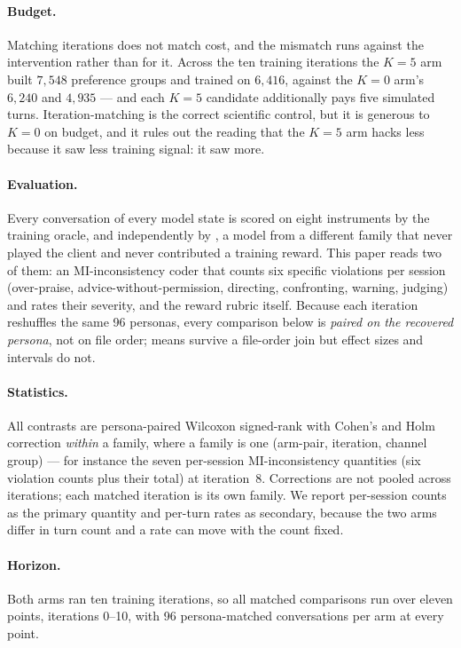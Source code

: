 \paragraph{Budget.} Matching iterations does not match cost, and the mismatch runs against the
intervention rather than for it. Across the ten training iterations the $K{=}5$ arm built $7{,}548$
preference groups and trained on $6{,}416$, against the $K{=}0$ arm's $6{,}240$ and $4{,}935$ ---
and each $K{=}5$ candidate additionally pays five simulated turns. Iteration-matching is the
correct scientific control, but it is generous to $K{=}0$ on budget, and it rules out the reading
that the $K{=}5$ arm hacks less because it saw less training signal: it saw more.

\paragraph{Evaluation.} Every conversation of every model state is scored on eight instruments by
the training oracle, and independently by \heldoutjudge{}, a model from a different family that
never played the client and never contributed a training reward. This paper reads two of them: an
MI-inconsistency coder that counts six specific violations per session (over-praise,
advice-without-permission, directing, confronting, warning, judging) and rates their severity, and
the reward rubric itself. Because each iteration reshuffles the same 96 personas, every comparison
below is \emph{paired on the recovered persona}, not on file order; means survive a file-order
join but effect sizes and intervals do not.

\paragraph{Statistics.} All contrasts are persona-paired Wilcoxon signed-rank with Cohen's \dz{}
and Holm correction \emph{within} a family, where a family is one (arm-pair, iteration, channel
group) --- for instance the seven per-session MI-inconsistency quantities (six violation counts
plus their total) at iteration~8. Corrections are not pooled across iterations; each matched
iteration is its own family. We report per-session counts
as the primary quantity and per-turn rates as secondary, because the two arms differ in turn count
and a rate can move with the count fixed.

\paragraph{Horizon.} Both arms ran ten training iterations, so all matched comparisons run over
eleven points, iterations 0--10, with 96 persona-matched conversations per arm at every point.

